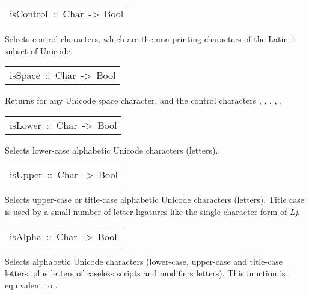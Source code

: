 \begin{haddockdesc}
\item[\begin{tabular}{@{}l}
isControl\ ::\ Char\ ->\ Bool
\end{tabular}]\haddockbegindoc
Selects control characters, which are the non-printing characters of
 the Latin-1 subset of Unicode.
\par

\end{haddockdesc}
\begin{haddockdesc}
\item[\begin{tabular}{@{}l}
isSpace\ ::\ Char\ ->\ Bool
\end{tabular}]\haddockbegindoc
Returns  for any Unicode space character, and the control
 characters , , , , .
\par

\end{haddockdesc}
\begin{haddockdesc}
\item[\begin{tabular}{@{}l}
isLower\ ::\ Char\ ->\ Bool
\end{tabular}]\haddockbegindoc
Selects lower-case alphabetic Unicode characters (letters).
\par

\end{haddockdesc}
\begin{haddockdesc}
\item[\begin{tabular}{@{}l}
isUpper\ ::\ Char\ ->\ Bool
\end{tabular}]\haddockbegindoc
Selects upper-case or title-case alphabetic Unicode characters (letters).
 Title case is used by a small number of letter ligatures like the
 single-character form of \emph{Lj}.
\par

\end{haddockdesc}
\begin{haddockdesc}
\item[\begin{tabular}{@{}l}
isAlpha\ ::\ Char\ ->\ Bool
\end{tabular}]\haddockbegindoc
Selects alphabetic Unicode characters (lower-case, upper-case and
 title-case letters, plus letters of caseless scripts and modifiers letters).
 This function is equivalent to .
\par

\end{haddockdesc}
